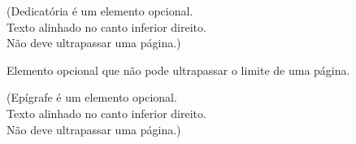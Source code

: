 \documentclass[
	12pt,				%
	openright,			%
	oneside,			%
	a4paper,			%
	english,			%
	french,				%
	spanish,			%
	brazil				%
	]{abntex2}
\begin{document}
\frenchspacing 



\imprimircapa
\imprimirfolhaderosto* %

%







\begin{dedicatoria}
    \vspace*{\fill}
	\begin{flushright}
    		(Dedicatória é um elemento opcional.\\ 
            Texto alinhado no canto inferior direito.\\
            Não deve ultrapassar uma página.)
	\end{flushright}
\end{dedicatoria}




\begin{agradecimentos}
    Elemento opcional que não pode ultrapassar o limite de uma página.
\end{agradecimentos}

\begin{epigrafe}
    \vspace*{\fill}
	\begin{flushright}
    		(Epígrafe é um elemento opcional.\\
    		Texto alinhado no canto inferior direito.\\
            Não deve ultrapassar uma página.)
	\end{flushright}
\end{epigrafe}
\end{document}

